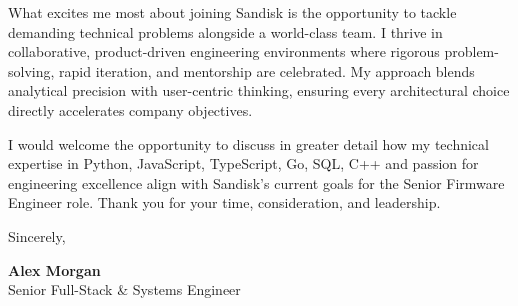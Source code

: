 \documentclass[letterpaper,11pt]{article}
\begin{document}
\vspace{10pt}

What excites me most about joining Sandisk is the opportunity to tackle demanding technical problems alongside a world-class team. I thrive in collaborative, product-driven engineering environments where rigorous problem-solving, rapid iteration, and mentorship are celebrated. My approach blends analytical precision with user-centric thinking, ensuring every architectural choice directly accelerates company objectives.\par

\vspace{10pt}

I would welcome the opportunity to discuss in greater detail how my technical expertise in Python, JavaScript, TypeScript, Go, SQL, C++ and passion for engineering excellence align with Sandisk's current goals for the Senior Firmware Engineer role. Thank you for your time, consideration, and leadership.\par

\vspace{18pt}

Sincerely,\par
\vspace{14pt}
\textbf{Alex Morgan}\\
Senior Full-Stack \& Systems Engineer
\end{document}
